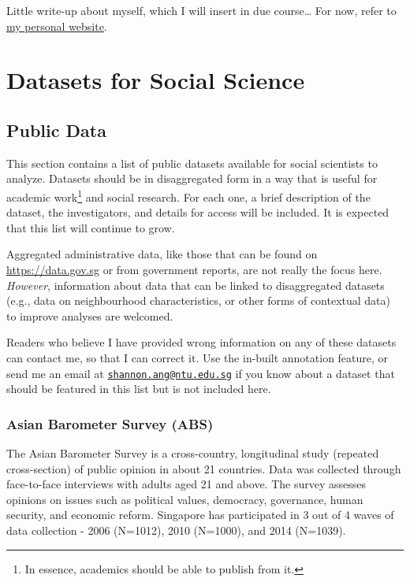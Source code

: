 \documentclass[openany]{book}
\let\rmarkdownfootnote\footnote%
\def\footnote{\protect\rmarkdownfootnote}
\begin{document}
Little write-up about myself, which I will insert in due course\ldots{}
For now, refer to \href{https://www.shannonang.net}{my personal
website}.

\part{Datasets for Social
Science}\label{part-datasets-for-social-science}

\chapter{Public Data}\label{publicdata}

This section contains a list of public datasets available for social
scientists to analyze. Datasets should be in disaggregated form in a way
that is useful for academic work\footnote{In essence, academics should
  be able to publish from it.} and social research. For each one, a
brief description of the dataset, the investigators, and details for
access will be included. It is expected that this list will continue to
grow.

Aggregated administrative data, like those that can be found on
\url{https://data.gov.sg} or from government reports, are not really the
focus here. \emph{However}, information about data that can be linked to
disaggregated datasets (e.g., data on neighbourhood characteristics, or
other forms of contextual data) to improve analyses are welcomed.

Readers who believe I have provided wrong information on any of these
datasets can contact me, so that I can correct it. Use the in-built
annotation feature, or send me an email at
\href{mailto:shannon.ang@ntu.edu.sg}{\nolinkurl{shannon.ang@ntu.edu.sg}}
if you know about a dataset that should be featured in this list but is
not included here.

\section{Asian Barometer Survey (ABS)}\label{abs}

The Asian Barometer Survey is a cross-country, longitudinal study
(repeated cross-section) of public opinion in about 21 countries. Data
was collected through face-to-face interviews with adults aged 21 and
above. The survey assesses opinions on issues such as political values,
democracy, governance, human security, and economic reform. Singapore
has participated in 3 out of 4 waves of data collection - 2006 (N=1012),
2010 (N=1000), and 2014 (N=1039).
\end{document}
